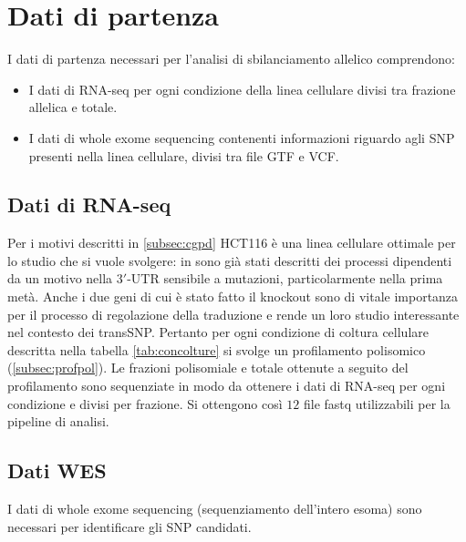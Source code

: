 \section{Dati di partenza}
\label{sec:datiinput}
I dati di partenza necessari per l'analisi di sbilanciamento allelico comprendono:
\begin{itemize}
  \item I dati di RNA-seq per ogni condizione della linea cellulare divisi tra frazione allelica e totale.
  \item I dati di whole exome sequencing contenenti informazioni riguardo agli SNP presenti nella linea cellulare, divisi tra file GTF e VCF.
\end{itemize}

  \subsection{Dati di RNA-seq}
  Per i motivi descritti in \ref{subsec:cgpd} HCT116 \`e una linea cellulare ottimale per lo studio che si vuole svolgere: in \cite{nutlin} sono gi\`a stati descritti dei processi dipendenti da un motivo nella $3'$-UTR sensibile a mutazioni, particolarmente nella prima met\`a.
  Anche i due geni di cui \`e stato fatto il knockout sono di vitale importanza per il processo di regolazione della traduzione e rende un loro studio interessante nel contesto dei transSNP.
  Pertanto per ogni condizione di coltura cellulare descritta nella tabella \ref{tab:concolture} si svolge un profilamento polisomico (\ref{subsec:profpol}).
  Le frazioni polisomiale e totale ottenute a seguito del profilamento sono sequenziate in modo da ottenere i dati di RNA-seq per ogni condizione e divisi per frazione.
  Si ottengono cos\`i $12$ file fastq utilizzabili per la pipeline di analisi.

  \subsection{Dati WES}
  I dati di whole exome sequencing (sequenziamento dell'intero esoma) sono necessari per identificare gli SNP candidati.
